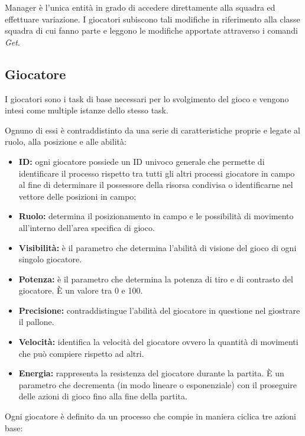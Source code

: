 \documentclass[aps,letterpaper,10pt]{article}
\begin{document}
Manager \`e l'unica entit\`a in grado di accedere direttamente alla squadra ed effettuare variazione. I giocatori subiscono tali modifiche in riferimento alla classe squadra di cui fanno parte e leggono le modifiche apportate attraverso i comandi \emph{Get}.

\subsection{Giocatore}
\label{giocatore}

I giocatori sono i task di base necessari per lo svolgimento del gioco e vengono intesi come multiple istanze dello stesso task. \vspace{3mm}

Ognuno di essi \`e contraddistinto da una serie di caratteristiche proprie e legate al ruolo, alla posizione e alle abilit\`a:

\begin{itemize}
	\item \textbf{ID:} ogni giocatore possiede un ID univoco generale che permette di identificare il processo rispetto tra tutti gli altri processi giocatore in campo al fine di determinare il possessore della risorsa condivisa o identificarne nel vettore delle posizioni in campo;
	\item \textbf{Ruolo:} determina il posizionamento in campo e le possibilit\`a di movimento all'interno dell'area specifica di gioco.
	\item \textbf{Visibilit\`a:} \`e il parametro che determina l'abilit\`a di visione del gioco di ogni singolo giocatore.
	\item \textbf{Potenza:} \`e il parametro che determina la potenza di tiro e di contrasto del giocatore. \`E un valore tra 0 e 100.
	\item \textbf{Precisione:} contraddistingue l'abilit\`a del giocatore in questione nel giostrare il pallone.
	\item \textbf{Velocit\`a:} identifica la velocit\`a del giocatore ovvero la quantit\`a di movimenti che pu\`o compiere rispetto ad altri.
	\item \textbf{Energia:} rappresenta la resistenza del giocatore durante la partita. \`E un parametro che decrementa (in modo lineare o esponenziale) con il proseguire delle azioni di gioco fino alla fine della partita.
\end{itemize}

Ogni giocatore \`e definito da un processo che compie in maniera ciclica tre azioni base:
\end{document}
